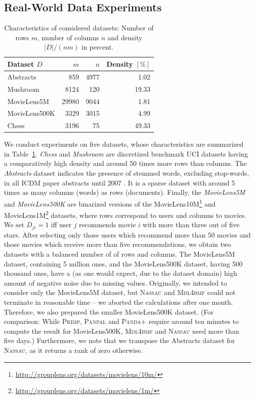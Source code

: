 \subsection{Real-World Data Experiments}\label{sec:MDL:RealWorld}
\begin{table} 
	\centering
	\begin{tabular}{lrrr}\toprule
    Dataset $D$ & $m$ & $n$ & Density $[\%]$\\ 
    \midrule
    Abstracts & 859 & 4977 & 1.02\\
    Mushroom & 8124 & 120 & 19.33\\
    MovieLens5M & 29980 &9044 &1.81\\
    MovieLens500K &3329 & 3015 & 4.99\\
    Chess & 3196 & 75 &49.33\\ \bottomrule
    \end{tabular}
    \caption{Characteristics of considered datasets: Number of rows $m$, number of columns $n$ and density $\lvert D\rvert/(nm)$ in percent.}
    \label{tbl:dataStats}
\end{table}
We conduct experiments on five datasets, whose characteristics are summarized in Table~\ref{tbl:dataStats}. \emph{Chess} and \emph{Mushroom} are discretized benchmark UCI datasets having a comparatively high density and around 50 times more rows than columns. The \emph{Abstracts} dataset indicates the presence of stemmed words, excluding stop-words, in all ICDM paper abstracts until 2007 \citep{deBie2011maximum}. It is a sparse dataset with around 5 times as many columns (words) as rows (documents). Finally, the \emph{MovieLens5M} and \emph{MovieLens500K} are binarized versions of the MovieLens10M\footnote{\url{http://grouplens.org/datasets/movielens/10m/}} and MovieLens1M\footnote{\url{http://grouplens.org/datasets/movielens/1m/}} datasets, where rows correspond to users and columns to movies. We set $D_{ji}=1$ iff user $j$ recommends movie $i$ with more than three out of five stars. After selecting only those users which recommend more than 50 movies and those movies which receive more than five recommendations, we obtain two datasets with a balanced number of of rows and columns. The MovieLens5M dataset, containing 5 million ones, and the MovieLens500K dataset, having 500 thousand ones, have a (as one would expect, due to the dataset domain) high amount of negative noise due to missing values. Originally, we intended to consider only the MovieLens5M dataset, but \textsc{Nassau} and \textsc{Mdl4bmf} could not terminate in reasonable time -- we aborted the calculations after one month. Therefore, we also prepared the smaller MovieLens500K dataset. (For comparison: While \textsc{Primp}, \textsc{Panpal} and \textsc{Panda+} require around ten minutes to compute the result for MovieLens500K, \textsc{Mdl4bmf} and \textsc{Nassau} need more than five days.)  Furthermore, we note that we transpose the Abstracts dataset for \textsc{Nassau}, as it returns a rank of zero otherwise.

